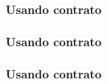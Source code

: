 \documentclass[14pt]{beamer}
\begin{document}
\frame
{
  \frametitle{Usando contrato}

  \usebox{\listingboxi}
}

\newsavebox{\listingboxj}
\begin{lrbox}{\listingboxj}

\end{lrbox}

\frame
{
  \frametitle{Usando contrato}

  \usebox{\listingboxj}
}

\newsavebox{\listingboxk}
\begin{lrbox}{\listingboxk}

\end{lrbox}

\newsavebox{\listingboxl}
\begin{lrbox}{\listingboxl}

\end{lrbox}

\frame
{
  \frametitle{Usando contrato}

  \usebox{\listingboxk}
  \usebox{\listingboxl}
}
\end{document}

